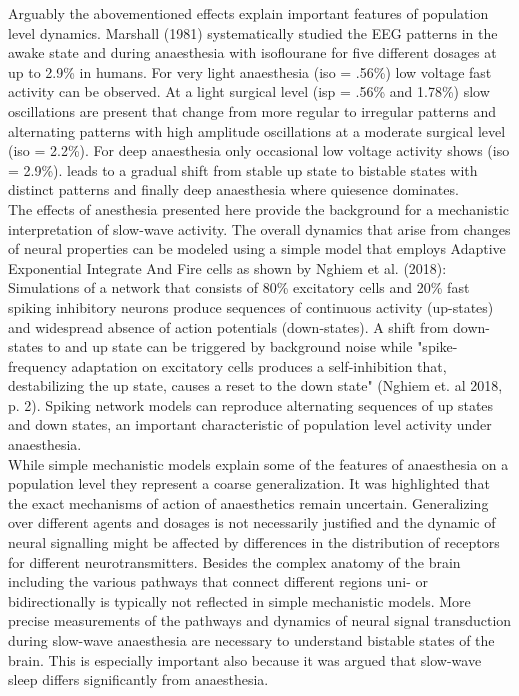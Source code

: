 Arguably the abovementioned effects explain important features of population level dynamics. Marshall (1981) systematically studied the EEG patterns in the awake state and during anaesthesia with isoflourane for five different dosages at up to 2.9\% in humans. For very light anaesthesia (iso = .56\%) low voltage fast activity can be observed. At a light surgical level (isp = .56\% and 1.78\%) slow oscillations are present that change from more regular to irregular patterns and alternating patterns with high amplitude oscillations at a moderate surgical level (iso = 2.2\%). For deep anaesthesia only occasional low voltage activity shows (iso = 2.9\%). leads to a gradual shift from stable up state to bistable states with distinct patterns and finally deep anaesthesia where quiesence dominates.\\
The effects of anesthesia presented here provide the background for a mechanistic interpretation of slow-wave activity. The overall dynamics that arise from changes of neural properties can be modeled using a simple model that employs Adaptive Exponential Integrate And Fire cells as shown by Nghiem et al. (2018): Simulations of a network that consists of 80\% excitatory cells and 20\% fast spiking inhibitory neurons produce sequences of continuous activity (up-states) and widespread absence of action potentials (down-states). A shift from down-states to and up state can be triggered by background noise while "spike-frequency adaptation on excitatory cells produces a self-inhibition that, destabilizing the up state, causes a reset to the down state" (Nghiem et. al 2018, p. 2). Spiking network models can reproduce alternating sequences of up states and down states, an important characteristic of population level activity under anaesthesia. \\
While simple mechanistic models explain some of the features of anaesthesia on a population level they represent a coarse generalization. It was highlighted that the exact mechanisms of action of anaesthetics remain uncertain. Generalizing over different agents and dosages is not necessarily justified and the dynamic of neural signalling might be affected by differences in the distribution of receptors for different neurotransmitters. Besides the complex anatomy of the brain including the various pathways that connect different regions uni- or bidirectionally is typically not reflected in simple mechanistic models. More precise measurements of the pathways and dynamics of neural signal transduction during slow-wave anaesthesia are necessary to understand bistable states of the brain. This is especially important also because it was argued that slow-wave sleep differs significantly from anaesthesia.

